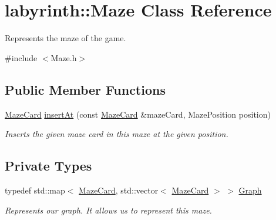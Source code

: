 \hypertarget{classlabyrinth_1_1_maze}{}\section{labyrinth\+::Maze Class Reference}
\label{classlabyrinth_1_1_maze}


Represents the maze of the game.  




{\ttfamily \#include $<$Maze.\+h$>$}

\subsection*{Public Member Functions}
\begin{DoxyCompactItemize}
\item 
\mbox{\hyperlink{structlabyrinth_1_1_maze_card}{Maze\+Card}} \mbox{\hyperlink{classlabyrinth_1_1_maze_a7160382f63fb23ae739a34ba6dcec303}{insert\+At}} (const \mbox{\hyperlink{structlabyrinth_1_1_maze_card}{Maze\+Card}} \&maze\+Card, Maze\+Position position)
\begin{DoxyCompactList}\small\item\em Inserts the given maze card in this maze at the given position. \end{DoxyCompactList}\end{DoxyCompactItemize}
\subsection*{Private Types}
\begin{DoxyCompactItemize}
\item 
\mbox{\label{classlabyrinth_1_1_maze_abb3bbbb15f15c845c59f63bff641d581}} 
typedef std\+::map$<$ \mbox{\hyperlink{structlabyrinth_1_1_maze_card}{Maze\+Card}}, std\+::vector$<$ \mbox{\hyperlink{structlabyrinth_1_1_maze_card}{Maze\+Card}} $>$ $>$ \mbox{\hyperlink{classlabyrinth_1_1_maze_abb3bbbb15f15c845c59f63bff641d581}{Graph}}
\begin{DoxyCompactList}\small\item\em Represents our graph. It allows us to represent this maze. \end{DoxyCompactList}\end{DoxyCompactItemize}
